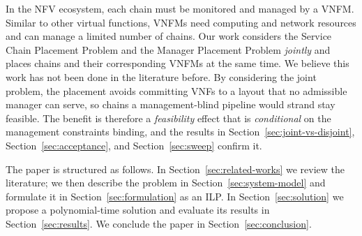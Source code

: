 In the NFV ecosystem, each chain must be monitored and managed by a VNFM.
Similar to other virtual functions, VNFMs need computing and network resources
and can manage a limited number of chains. Our work considers the Service Chain
Placement Problem and the Manager Placement Problem \emph{jointly} and places
chains and their corresponding VNFMs at the same time. We believe this work has
not been done in the literature before. By considering the joint problem, the
placement avoids committing VNFs to a layout that no admissible manager can
serve, so chains a management-blind pipeline would strand stay feasible. The
benefit is therefore a \emph{feasibility} effect that is \emph{conditional} on
the management constraints binding, and the results in
Section~\ref{sec:joint-vs-disjoint}, Section~\ref{sec:acceptance}, and
Section~\ref{sec:sweep} confirm it.

The paper is structured as follows. In Section~\ref{sec:related-works} we review
the literature; we then describe the problem in Section~\ref{sec:system-model}
and formulate it in Section~\ref{sec:formulation} as an ILP. In
Section~\ref{sec:solution} we propose a polynomial-time solution and evaluate its
results in Section~\ref{sec:results}. We conclude the paper in
Section~\ref{sec:conclusion}.
